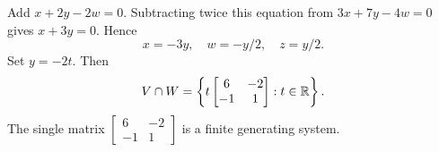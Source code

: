 \begin{enumerate}[label=\alph*)]
\begin{answer}
Add $x+2y-2w=0$. Subtracting twice this equation from
$3x+7y-4w=0$ gives $x+3y=0$. Hence
\[
 x=-3y,\quad w=-y/2,\quad z=y/2.
\]
Set $y=-2t$. Then
\[
 V\cap W=\left\{t\begin{bmatrix}6&-2\\-1&1\end{bmatrix}:t\in\mathbb R\right\}.
\]
The single matrix $\begin{bmatrix}6&-2\\-1&1\end{bmatrix}$ is a finite generating system.
\end{answer}
\end{enumerate}
